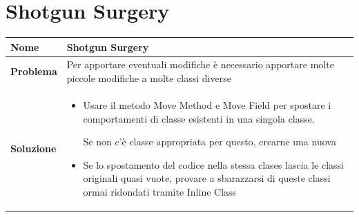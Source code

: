 \section{Shotgun Surgery}
\begin{table}[h]
    \centering
    \renewcommand{\arraystretch}{1.2} %
    \begin{tabularx}{\textwidth}{l X}
        \toprule
        \textbf{Nome} & Shotgun Surgery \\
        \midrule
        \textbf{Problema} & Per apportare eventuali modifiche è necessario apportare molte piccole modifiche a molte classi diverse \\
        \midrule
        \textbf{Soluzione} & 
        \begin{itemize}[leftmargin=*, nosep, after=\vspace{0.5em}]
            \item Usare il metodo Move Method e Move Field per spostare i comportamenti di classe esistenti in una singola classe.

            Se non c'è classe appropriata per questo, crearne una nuova
            \item Se lo spostamento del codice nella stessa clases lascia le classi originali quasi vuote, provare a sbarazzarsi di queste classi ormai ridondati tramite Inline Class
        \end{itemize}
        \\ %
        \bottomrule
    \end{tabularx}
\end{table}

